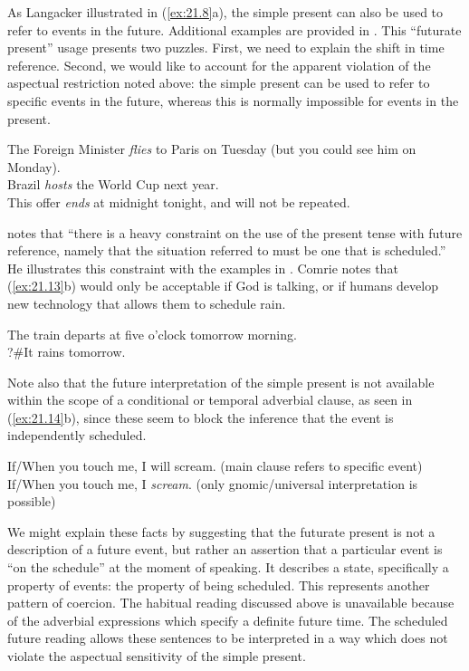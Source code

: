 As Langacker illustrated in (\ref{ex:21.8}a), the simple present can also be used to refer to events in the future. Additional examples are provided in . This “futurate present” usage presents two puzzles. First, we need to explain the shift in time reference. Second, we would like to account for the apparent violation of the aspectual restriction noted above: the simple present can be used to refer to specific events in the future, whereas this is normally impossible for events in the present.

\ea \label{ex:21.12}
\ea  The Foreign Minister \textit{flies} to Paris on Tuesday (but you could see him on Monday).\\
\ex Brazil \textit{hosts} the World Cup next year.\\
\ex This offer \textit{ends} at midnight tonight, and will not be repeated.
                       \z
\z

\citet[47]{Comrie1976} notes that “there is a heavy constraint on the use of the present tense with future reference, namely that the situation referred to must be one that is scheduled.” He illustrates this constraint with the examples in . Comrie notes that (\ref{ex:21.13}b) would only be acceptable if God is talking, or if humans develop new technology that allows them to schedule rain.

\ea \label{ex:21.13}
\ea  The train departs at five o’clock tomorrow morning.\\
\ex ?\#It rains tomorrow.
                       \z
\z

Note also that the future interpretation of the simple present is not available within the scope of a conditional or temporal adverbial clause, as seen in (\ref{ex:21.14}b), since these seem to block the inference that the event is independently scheduled.

\ea \label{ex:21.14}
\ea  If/When you touch me, I will scream.  (main clause refers to specific event)\\
\ex If/When you touch me, I \textit{scream}.  (only gnomic/universal interpretation is possible)
                       \z
\z

We might explain these facts by suggesting that the futurate present is not a description of a future event, but rather an assertion that a particular event is “on the schedule” at the moment of speaking. It describes a state, specifically a property of events: the property of being scheduled. This represents another pattern of coercion. The habitual reading discussed above is unavailable because of the adverbial expressions which specify a definite future time. The scheduled future reading allows these sentences to be interpreted in a way which does not violate the aspectual sensitivity of the simple present.


